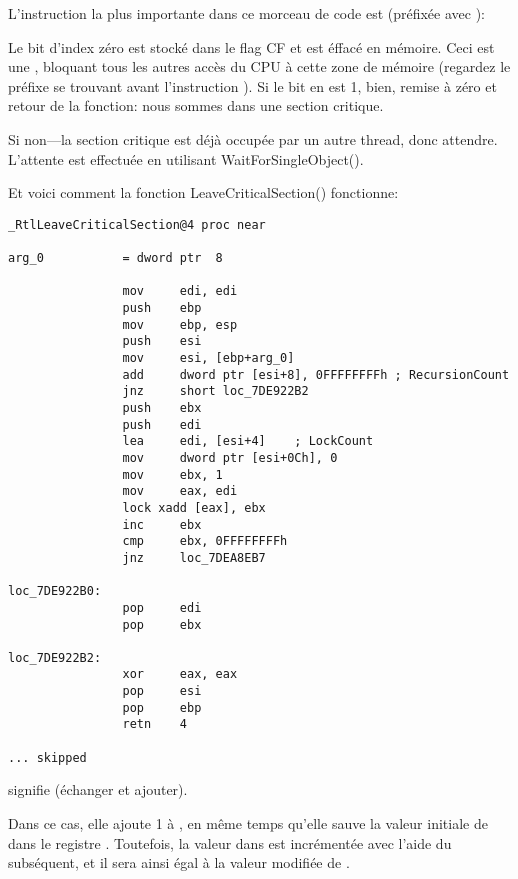 
L'instruction la plus importante dans ce morceau de code est  (préfixée avec ):

Le bit d'index zéro est stocké dans le flag CF et est éffacé en mémoire.
Ceci est une , bloquant tous les autres
accès du CPU à cette zone de mémoire (regardez le préfixe  se trouvant avant
l'instruction ). Si le bit en  est 1,
bien, remise à zéro et retour de la fonction: nous sommes dans une section critique.

Si non---la section critique est déjà occupée par un autre thread, donc attendre.
L'attente est effectuée en utilisant WaitForSingleObject().

Et voici comment la fonction LeaveCriticalSection() fonctionne:

\begin{lstlisting}[caption=Windows 2008/ntdll.dll/x86 (begin),style=customasmx86]
_RtlLeaveCriticalSection@4 proc near

arg_0           = dword ptr  8

                mov     edi, edi
                push    ebp
                mov     ebp, esp
                push    esi
                mov     esi, [ebp+arg_0]
                add     dword ptr [esi+8], 0FFFFFFFFh ; RecursionCount
                jnz     short loc_7DE922B2
                push    ebx
                push    edi
                lea     edi, [esi+4]    ; LockCount
                mov     dword ptr [esi+0Ch], 0
                mov     ebx, 1
                mov     eax, edi
                lock xadd [eax], ebx
                inc     ebx
                cmp     ebx, 0FFFFFFFFh
                jnz     loc_7DEA8EB7

loc_7DE922B0:
                pop     edi
                pop     ebx

loc_7DE922B2:
                xor     eax, eax
                pop     esi
                pop     ebp
                retn    4

... skipped
\end{lstlisting}

 signifie  (échanger et ajouter).

Dans ce cas, elle ajoute 1 à , en même temps qu'elle sauve la valeur
initiale de  dans le registre .
Toutefois, la valeur dans  est incrémentée avec l'aide du  subséquent,
et il sera ainsi égal à la valeur modifiée de .


